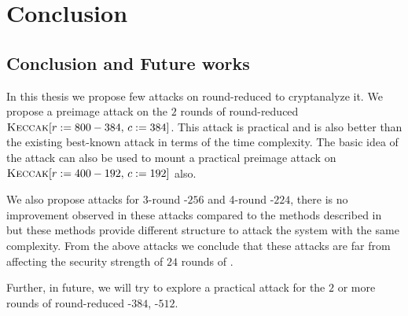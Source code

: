 \chapter{Conclusion}

\section{Conclusion and Future works}
In this thesis we propose few attacks on round-reduced \KECCAK{} to cryptanalyze it. We propose a preimage attack on the $2$ rounds of round-reduced $\mbox{\textsc{Keccak}}[r:=800-384,\,c:=384]$. This attack is practical and is also better than the existing best-known attack in terms of the time complexity. The basic idea of the attack can also be used to mount a practical preimage attack on $\mbox{\textsc{Keccak}}[r:=400-192,\, c:=192]$ also.
 
We also propose attacks for 3-round \Keccak{}-$256$ and 4-round \Keccak-$224$, there is no improvement observed in these attacks compared to the methods described in~\cite{guo2016linear} but these methods provide different structure to attack the system with the same complexity.
From the above attacks we conclude that these attacks are far from affecting the security strength of $24$ rounds of \Keccak{}.

Further, in future, we will try to explore a practical attack for the $2$ or more rounds of round-reduced \KECCAK-$384$, \KECCAK-$512$.
